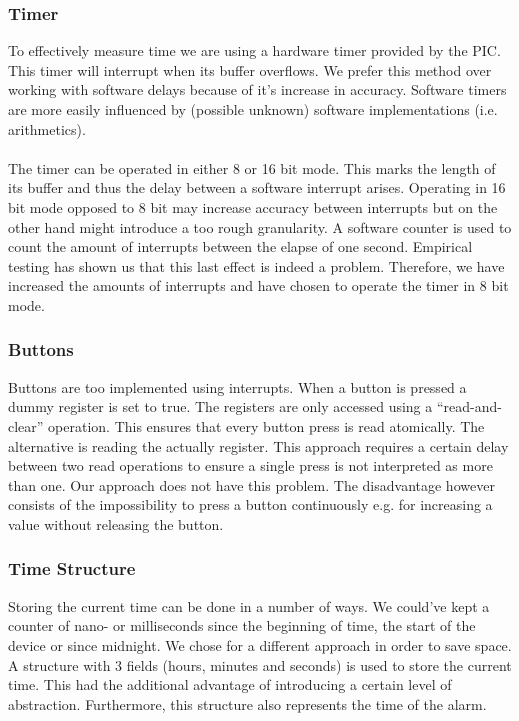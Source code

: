 \documentclass[11pt]{article}
\begin{document}
\subsubsection{Timer}
To effectively measure time we are using a hardware timer provided by the PIC. This timer will interrupt when its buffer overflows. We prefer this method over working with software delays because of it's increase in accuracy. Software timers are more easily influenced by (possible unknown) software implementations (i.e. arithmetics).
\\\\
The timer can be operated in either 8 or 16 bit mode. This marks the length of its buffer and thus the delay between a software interrupt arises. Operating in 16 bit mode opposed to 8 bit may increase accuracy between interrupts but on the other hand might introduce a too rough granularity. A software counter is used to count the amount of interrupts between the elapse of one second. Empirical testing has shown us that this last effect is indeed a problem. Therefore, we have increased the amounts of interrupts and have chosen to operate the timer in 8 bit mode.

\subsubsection{Buttons}
Buttons are too implemented using interrupts. When a button is pressed a dummy register is set to true. The registers are only accessed using a ``read-and-clear'' operation. This ensures that every button press is read atomically. The alternative is reading the actually register. This approach requires a certain delay between two read operations to ensure a single press is not interpreted as more than one. Our approach does not have this problem. The disadvantage however consists of the impossibility to press a button continuously e.g. for increasing a value without releasing the button.

\subsubsection{Time Structure}
Storing the current time can be done in a number of ways. We could've kept a counter of nano- or milliseconds since the beginning of time, the start of the device or since midnight. We chose for a different approach in order to save space. A structure with 3 fields (hours, minutes and seconds) is used to store the current time. This had the additional advantage of introducing a certain level of abstraction. Furthermore, this structure also represents the time of the alarm.  
\end{document}
